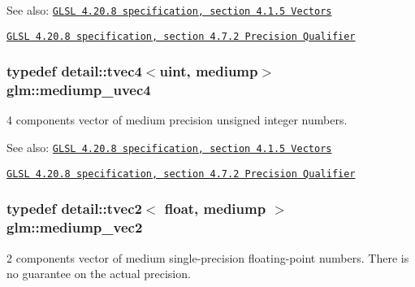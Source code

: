 \begin{Desc}
\item[See also:]\href{http://www.opengl.org/registry/doc/GLSLangSpec.4.20.8.pdf}{\tt GLSL 4.20.8 specification, section 4.1.5 Vectors} 

\href{http://www.opengl.org/registry/doc/GLSLangSpec.4.20.8.pdf}{\tt GLSL 4.20.8 specification, section 4.7.2 Precision Qualifier} \end{Desc}
\hypertarget{group__core__precision_gd90c29c2643136a9bcb1165eac47c810}{
\subsubsection[mediump\_\-uvec4]{\setlength{\rightskip}{0pt plus 5cm}typedef detail::tvec4$<$uint, mediump$>$ {\bf glm::mediump\_\-uvec4}}}
\label{group__core__precision_gd90c29c2643136a9bcb1165eac47c810}


4 components vector of medium precision unsigned integer numbers.

\begin{Desc}
\item[See also:]\href{http://www.opengl.org/registry/doc/GLSLangSpec.4.20.8.pdf}{\tt GLSL 4.20.8 specification, section 4.1.5 Vectors} 

\href{http://www.opengl.org/registry/doc/GLSLangSpec.4.20.8.pdf}{\tt GLSL 4.20.8 specification, section 4.7.2 Precision Qualifier} \end{Desc}
\hypertarget{group__core__precision_g1365858c541931eb8a7473fa85a1d1cf}{
\subsubsection[mediump\_\-vec2]{\setlength{\rightskip}{0pt plus 5cm}typedef detail::tvec2$<$ float, mediump $>$ {\bf glm::mediump\_\-vec2}}}
\label{group__core__precision_g1365858c541931eb8a7473fa85a1d1cf}


2 components vector of medium single-precision floating-point numbers. There is no guarantee on the actual precision.

